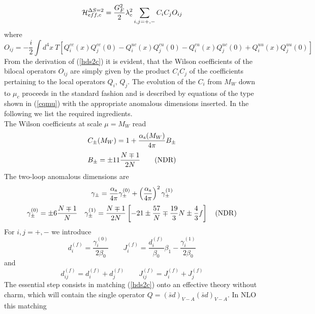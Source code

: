 \begin{equation}\label{hds2c}
{\cal H}^{\Delta S=2}_{eff,c}=\frac{G^2_F}{2}\lambda^2_c
 \sum_{i,j=+,-}C_i C_j O_{ij}
\end{equation}
where
\begin{equation}\label{oijdef}
O_{ij}=-\frac{i}{2}\int d^4x\ T\left[
Q^{cc}_i(x)Q^{cc}_j(0)-Q^{uc}_i(x)Q^{cu}_j(0)-
Q^{cu}_i(x)Q^{uc}_j(0)+Q^{uu}_i(x)Q^{uu}_j(0) \right]
\end{equation}
From the derivation of (\ref{hds2c}) it is evident, that the
Wilson coefficients of the bilocal operators $O_{ij}$ are simply given
by the product $C_i C_j$ of the coefficients pertaining to the
local operators $Q_i$, $Q_j$. The evolution of the $C_i$ from $M_W$
down to $\mu_c$ proceeds in the standard fashion and is described
by equations of the type shown in (\ref{cqmu}) with the
appropriate anomalous dimensions inserted. In the following we list
the required ingredients.
\\
The Wilson coefficients at scale $\mu=M_W$ read
\begin{equation}\label{cpmw}
C_\pm(M_W)=1+\frac{\alpha_{\rm s}(M_W)}{4\pi}B_\pm
\end{equation}
\begin{equation}\label{bpmn}
B_\pm=\pm 11\frac{N\mp 1}{2N}   \qquad {\rm (NDR)}
\end{equation}
The two-loop anomalous dimensions are
\begin{equation}\label{gapm1}
\gamma_\pm=\frac{\alpha_{\rm s}}{4\pi}\gamma^{(0)}_\pm+
       \left(\frac{\alpha_{\rm s}}{4\pi}\right)^2\gamma^{(1)}_\pm
\end{equation}
\begin{equation}\label{gapm2}
\gamma^{(0)}_\pm=\pm 6\frac{N\mp 1}{N}\quad
\gamma^{(1)}_\pm=\frac{N\mp 1}{2N}\left[-21\pm\frac{57}{N}\mp\frac{19}{3}N
 \pm\frac{4}{3} f\right]\quad ({\rm NDR})
\end{equation}
For $i,j=+,-$ we introduce
\begin{equation}\label{dzi}
d^{(f)}_i=\frac{\gamma^{(0)}_i}{2\beta_0} \qquad
J^{(f)}_i= \frac{d^{(f)}_i}{\beta_0}\beta_1 - \frac{\gamma^{(1)}_i}{2\beta_0}
\end{equation}
and
\begin{equation}\label{dzij}
d^{(f)}_{ij}=d^{(f)}_i+d^{(f)}_j \qquad
J^{(f)}_{ij}=J^{(f)}_i+J^{(f)}_j
\end{equation}
The essential step consists in matching (\ref{hds2c}) onto an
effective theory without charm, which will contain the single
operator $Q=(\bar sd)_{V-A}(\bar sd)_{V-A}$. In NLO this matching
